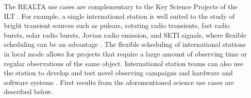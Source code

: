 The REALTA use cases are complementary to the Key Science Projects of the ILT \citep[KSP; see][]{VanHaarlem2013}. For example, a single international station is well suited to the study of bright transient sources such as pulsars, rotating radio transients, fast radio bursts, solar radio bursts, Jovian radio emission, and SETI signals, where flexible scheduling can be an advantage \citep[for example,][]{Maguire2020, Morosan2019}. The flexible scheduling of international stations in local mode allows for projects that require a large amount of observing time or regular observations of the same object. International station teams can also use the station to develop and test novel observing campaigns and hardware and software systems \citep[for example,][]{Scully2021}. First results from the aforementioned science use cases are described below.

